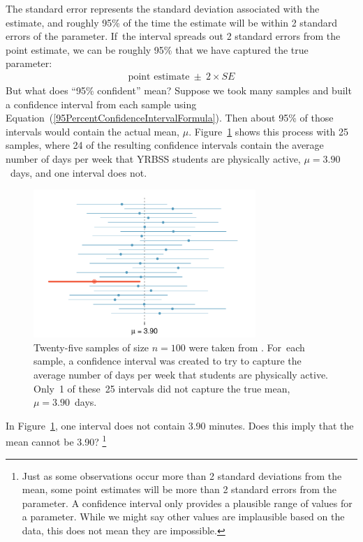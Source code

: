 The standard error represents the standard deviation associated with the estimate, and roughly 95\% of the time the estimate will be within 2 standard errors of the parameter. If~the interval spreads out 2 standard errors from the point estimate, we can be roughly 95\%  that we have captured the true parameter:
\begin{eqnarray}
\text{point estimate}\ \pm\ 2\times SE
\label{95PercentConfidenceIntervalFormula}
\end{eqnarray}
But what does ``95\% confident'' mean? Suppose we took many samples and built a confidence interval from each sample using Equation~(\ref{95PercentConfidenceIntervalFormula}). Then about 95\% of those intervals would contain the actual mean, $\mu$. Figure~\ref{95PercentConfidenceInterval} shows this process with 25 samples, where 24 of the resulting confidence intervals contain the average number of days per week that YRBSS students are physically active, $\mu=3.90$~days, and one interval does not.

\begin{figure}[hht]
   \centering
   \includegraphics[width=0.75\textwidth]{ch_inference_foundations/figures/95PercentConfidenceInterval/95PercentConfidenceInterval}
   \caption{Twenty-five samples of size $n=100$ were taken from . For~each sample, a confidence interval was created to try to capture the average number of days per week that students are physically active. Only~1 of these~25 intervals did not capture the true mean, $\mu = 3.90$~days.}
   \label{95PercentConfidenceInterval}
\end{figure}

\begin{exercise}
In Figure~\ref{95PercentConfidenceInterval}, one interval does not contain 3.90 minutes. Does this imply that the mean cannot be 3.90? \footnote{Just as some observations occur more than 2 standard deviations from the mean, some point estimates will be more than 2 standard errors from the parameter. A confidence interval only provides a plausible range of values for a parameter. While we might say other values are implausible based on the data, this does not mean they are impossible.}
\end{exercise}

